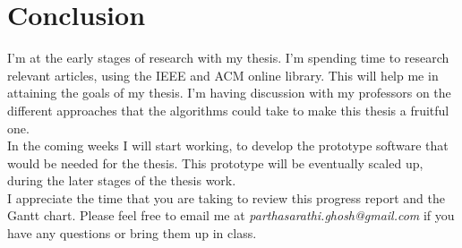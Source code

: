 \documentclass[letterpaper,12pt]{texMemo}
\begin{document}
\section*{Conclusion}
%
%
%


\noindent I'm at the early stages of research with my thesis. I'm spending time to research relevant articles, using the IEEE and ACM online library. This will help me in attaining the goals of my thesis. I'm having discussion with my professors on the different approaches that the algorithms could take to make this thesis a fruitful one. \\ 


\noindent In the coming weeks I will start working, to develop the prototype software that would be needed for the thesis. This prototype will be eventually scaled up, during the later stages of the thesis work. \\

\noindent I appreciate the time that you are taking to review this progress report and the Gantt chart. Please feel free to email me at \textit{parthasarathi.ghosh@gmail.com} if you have any questions or bring them up in class.
\end{document}
